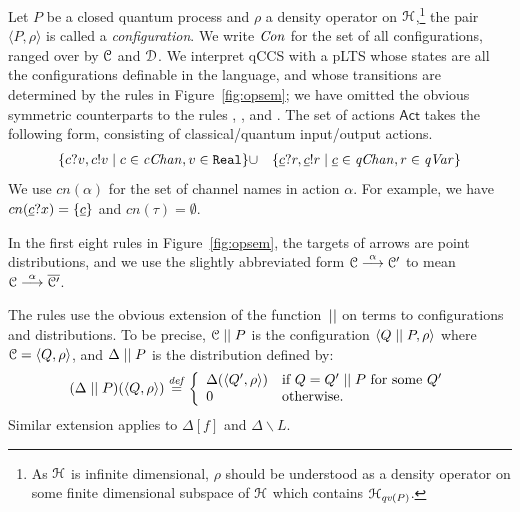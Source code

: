 \documentclass[a4paper,UKenglish,cleveref, autoref]{lipics-v2019}
\def\>{\ensuremath{\rangle}}
\def\<{\ensuremath{\langle}}
\def\h{\ensuremath{\mathcal{H}}}
\newcommand{\define}{\stackrel{\it def}=}
\newcommand{\pdist}[1]{\overline{#1}  } %
\newcommand{\Act}{\ensuremath{\mathsf{Act}}\xspace}
\newcommand{\pair}[1]{\langle{#1}\rangle}
\newcommand{\Con}{{\it Con}}
\newcommand{\qv}{{\it qv}}
\newcommand{\qc}{\underline{c}}
\newcommand{\qVar}{{\it qVar}}
\newcommand{\cChan}{{\it cChan}}
\newcommand{\qChan}{{\it qChan}}
\newcommand{\CH}{{\cal H}}
\newcommand{\CC}{{\cal C}}
\newcommand{\CD}{{\cal D}}
\begin{document}
Let $P$ be a closed quantum process and $\rho$ a density operator on $\CH$,\footnote{As $\CH$ is infinite dimensional, $\rho$ should be understood as a density operator on some finite dimensional subspace of $\CH$ which contains $\h_{\qv(P)}$.} the pair $\pair{P,\rho}$ is called a \emph{configuration}. We write $\Con$ for the set of all configurations, ranged over by $\CC$ and $\CD$.
We interpret qCCS with a pLTS whose states are all the configurations definable in the language,
and whose transitions are determined by the rules in Figure~\ref{fig:opsem}; we have omitted the obvious
symmetric counterparts to the rules , ,  and
.
The set of actions $\Act$ takes the following form, consisting of classical/quantum input/output actions.
\begin{eqnarray*}
	\sset{c?v, c!v \mid c\in \cChan, v\in\texttt{Real}}&\cup&
	\sset{\qc?r,\qc!r \mid \qc\in \qChan,r\in \qVar}
\end{eqnarray*}
We use $cn(\alpha)$ for the set of channel names in action $\alpha$. For example, we have $cn(\qc?x)=\sset{\qc}$ and $cn(\tau)=\emptyset$.

In the first eight rules in Figure~\ref{fig:opsem}, the targets of arrows are point distributions, and we use the slightly abbreviated form $\CC\ar{\alpha}\CC'$ to mean $\CC\ar{\alpha}\pdist{\CC'}$.

The rules use the obvious extension of the function~$\mathrel{||}$ on terms to configurations and distributions. To be precise,
$\CC\Cpar P$ is the configuration $\<Q\Cpar P,\rho \>$ where $\CC=\<Q,\rho\>$, and
$\Delta\mathrel{||} P$ is the distribution defined by:
\[(\Delta\Cpar P)(\pair{Q,\rho}) \define \left\{\begin{array}{ll}
\Delta(\pair{Q',\rho}) & \mbox{if $Q=Q'\Cpar P$ for some } Q'\\
0 & \mbox{otherwise.}
\end{array}\right.\]
Similar extension applies to $\Delta[f]$ and $\Delta\backslash L$.
\end{document}

